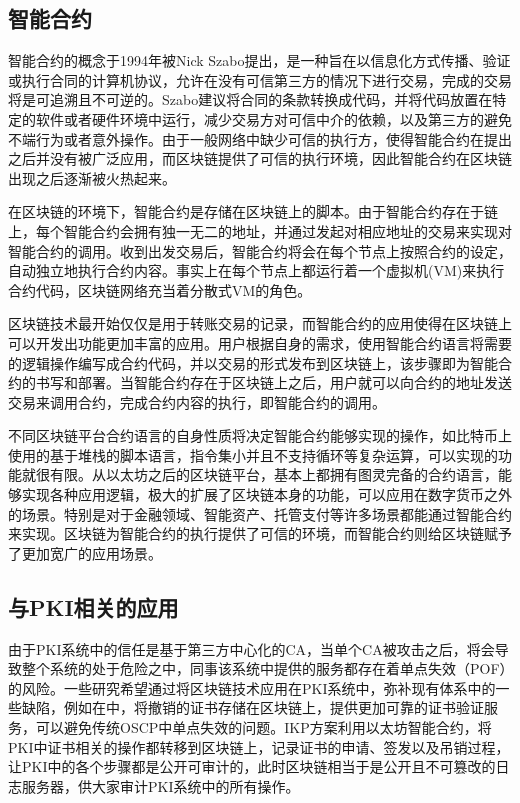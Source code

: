 \subsection{智能合约}

智能合约的概念于1994年被Nick Szabo提出\cite{szabo1996smart}，是一种旨在以信息化方式传播、验证或执行合同的计算机协议，允许在没有可信第三方的情况下进行交易，完成的交易将是可追溯且不可逆的。Szabo建议将合同的条款转换成代码，并将代码放置在特定的软件或者硬件环境中运行，减少交易方对可信中介的依赖，以及第三方的避免不端行为或者意外操作。由于一般网络中缺少可信的执行方，使得智能合约在提出之后并没有被广泛应用，而区块链提供了可信的执行环境，因此智能合约在区块链出现之后逐渐被火热起来。

在区块链的环境下，智能合约是存储在区块链上的脚本。由于智能合约存在于链上，每个智能合约会拥有独一无二的地址，并通过发起对相应地址的交易来实现对智能合约的调用。收到出发交易后，智能合约将会在每个节点上按照合约的设定，自动独立地执行合约内容。事实上在每个节点上都运行着一个虚拟机(VM)来执行合约代码，区块链网络充当着分散式VM的角色。

区块链技术最开始仅仅是用于转账交易的记录，而智能合约的应用使得在区块链上可以开发出功能更加丰富的应用。用户根据自身的需求，使用智能合约语言将需要的逻辑操作编写成合约代码，并以交易的形式发布到区块链上，该步骤即为智能合约的书写和部署。当智能合约存在于区块链上之后，用户就可以向合约的地址发送交易来调用合约，完成合约内容的执行，即智能合约的调用。


不同区块链平台合约语言的自身性质将决定智能合约能够实现的操作，如比特币上使用的基于堆栈的脚本语言，指令集小并且不支持循环等复杂运算，可以实现的功能就很有限。从以太坊之后的区块链平台，基本上都拥有图灵完备的合约语言，能够实现各种应用逻辑，极大的扩展了区块链本身的功能，可以应用在数字货币之外的场景。特别是对于金融领域、智能资产、托管支付等许多场景都能通过智能合约来实现。区块链为智能合约的执行提供了可信的环境，而智能合约则给区块链赋予了更加宽广的应用场景。



\subsection{与PKI相关的应用}




由于PKI系统中的信任是基于第三方中心化的CA，当单个CA被攻击之后，将会导致整个系统的处于危险之中，同事该系统中提供的服务都存在着单点失效（POF）的风险。一些研究希望通过将区块链技术应用在PKI系统中，弥补现有体系中的一些缺陷，例如在\parencite{baldi2017certificate}中，将撤销的证书存储在区块链上，提供更加可靠的证书验证服务，可以避免传统OSCP中单点失效的问题。IKP\cite{matsumoto2016ikp}方案利用以太坊智能合约，将PKI中证书相关的操作都转移到区块链上，记录证书的申请、签发以及吊销过程，让PKI中的各个步骤都是公开可审计的，此时区块链相当于是公开且不可篡改的日志服务器，供大家审计PKI系统中的所有操作。

